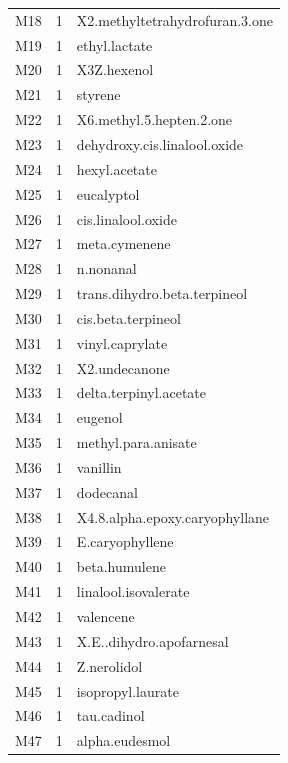 \begin{longtable}{@{}l r p{}@{}}
M18 & 1 & X2.\allowbreak{}methyltetrahydrofuran.\allowbreak{}3.\allowbreak{}one \\
M19 & 1 & ethyl.\allowbreak{}lactate \\
M20 & 1 & X3Z.\allowbreak{}hexenol \\
M21 & 1 & styrene \\
M22 & 1 & X6.\allowbreak{}methyl.\allowbreak{}5.\allowbreak{}hepten.\allowbreak{}2.\allowbreak{}one \\
M23 & 1 & dehydroxy.\allowbreak{}cis.\allowbreak{}linalool.\allowbreak{}oxide \\
M24 & 1 & hexyl.\allowbreak{}acetate \\
M25 & 1 & eucalyptol \\
M26 & 1 & cis.\allowbreak{}linalool.\allowbreak{}oxide \\
M27 & 1 & meta.\allowbreak{}cymenene \\
M28 & 1 & n.\allowbreak{}nonanal \\
M29 & 1 & trans.\allowbreak{}dihydro.\allowbreak{}beta.\allowbreak{}terpineol \\
M30 & 1 & cis.\allowbreak{}beta.\allowbreak{}terpineol \\
M31 & 1 & vinyl.\allowbreak{}caprylate \\
M32 & 1 & X2.\allowbreak{}undecanone \\
M33 & 1 & delta.\allowbreak{}terpinyl.\allowbreak{}acetate \\
M34 & 1 & eugenol \\
M35 & 1 & methyl.\allowbreak{}para.\allowbreak{}anisate \\
M36 & 1 & vanillin \\
M37 & 1 & dodecanal \\
M38 & 1 & X4.\allowbreak{}8.\allowbreak{}alpha.\allowbreak{}epoxy.\allowbreak{}caryophyllane \\
M39 & 1 & E.\allowbreak{}caryophyllene \\
M40 & 1 & beta.\allowbreak{}humulene \\
M41 & 1 & linalool.\allowbreak{}isovalerate \\
M42 & 1 & valencene \\
M43 & 1 & X.\allowbreak{}E.\allowbreak{}.\allowbreak{}dihydro.\allowbreak{}apofarnesal \\
M44 & 1 & Z.\allowbreak{}nerolidol \\
M45 & 1 & isopropyl.\allowbreak{}laurate \\
M46 & 1 & tau.\allowbreak{}cadinol \\
M47 & 1 & alpha.\allowbreak{}eudesmol \\

\end{longtable}
